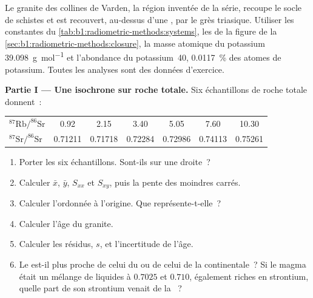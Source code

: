 \begin{problem}
\label{pb:b1:radiometric-methods:1}
Le granite des collines de Varden, la région inventée de la série, recoupe le
socle de schistes et est recouvert, au-dessus d'une , par le grès triasique. Utiliser les constantes du \cref{tab:b1:radiometric-methods:systems}, les
 de la figure de la \cref{sec:b1:radiometric-methods:closure},
la masse atomique du potassium \qty{39.098}{g.mol^{-1}} et l'abondance du
potassium~40, \qty{0.0117}{\percent} des atomes de potassium. Toutes les analyses sont
des données d'exercice.

\medskip
\noindent\textbf{Partie I --- Une isochrone sur roche totale.} Six échantillons de roche totale donnent~:
\begin{center}
\small
\begin{tabular}{|l|cccccc|}
\hline
$^{87}\mathrm{Rb}/^{86}\mathrm{Sr}$ & 0.92 & 2.15 & 3.40 & 5.05 & 7.60 & 10.30 \\
$^{87}\mathrm{Sr}/^{86}\mathrm{Sr}$ & 0.71211 & 0.71718 & 0.72284 & 0.72986 & 0.74113 & 0.75261 \\
\hline
\end{tabular}
\end{center}
\begin{enumerate}
  \item Porter les six échantillons. Sont-ils sur une droite~?
  \item Calculer $\bar x$, $\bar y$, $S_{xx}$ et $S_{xy}$, puis la pente
        des moindres carrés.
  \item Calculer l'ordonnée à l'origine. Que représente-t-elle~?
  \item Calculer l'âge du granite.
  \item Calculer les résidus, $s$, et l'incertitude de l'âge.
  \item Le  est-il plus proche de celui du  ou de celui de la 
        continentale~? Si le magma était un mélange de liquides à $0.7025$ et $0.710$,
        également riches en strontium, quelle part de son strontium venait de la
        ~?
\end{enumerate}


\end{problem}
